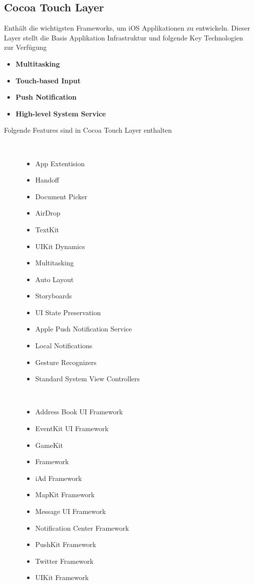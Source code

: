 \subsection{Cocoa Touch Layer}
\label{sec:CocoaTouchLayer}
Enthält die wichtigsten Frameworks, um iOS Applikationen zu entwickeln. Dieser
Layer stellt die Basis Applikation Infrastruktur und folgende Key Technologien zur Verfügung
	\begin{itemize}
		\item \textbf{Multitasking}
		\item \textbf{Touch-based Input}
		\item \textbf{Push Notification}
		\item \textbf{High-level System Service}	
	\end{itemize}
\begin{description}
\item[Folgende Features sind in Cocoa Touch Layer enthalten]~\par
	\begin{multicols}{2}
	\begin{itemize}
		\item App Extentision
		\item Handoff
		\item Document Picker
		\item AirDrop
		\item TextKit
		\item UIKit Dynamics
		\item Multitasking
		\item Auto Layout
		\item Storyboards
		\item UI State Preservation
		\item Apple Push Notification Service
		\item Local Notifications
		\item Gesture Recognizers
		\item Standard System View Controllers
         \end{itemize}
	\end{multicols}	
	 \item[\parbox{\textwidth} {Das Cocoa Touch Layer Framework beinhaltet folgende Frameworks}]~\par
	\begin{multicols}{2}
	\begin{itemize}
		\item Address Book UI Framework
		\item EventKit UI Framework
		\item GameKit
		\item  Framework
		\item iAd Framework
		\item MapKit Framework
		\item Message UI Framework
		\item Notification Center Framework
		\item PushKit Framework
		\item Twitter Framework
		\item UIKit Framework
         \end{itemize}
	\end{multicols}
\end{description}

